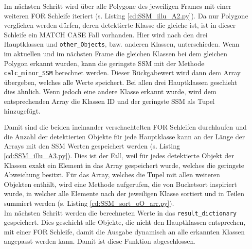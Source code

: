 {	Im nächsten Schritt wird über alle Polygone des jeweiligen Frames mit einer weiteren FOR Schleife iteriert \ifimportant (s. Listing \ref{cd:SSM_illu_A2.py})\fi. Da nur Polygone verglichen werden dürfen, deren detektierte Klasse die gleiche ist, ist in dieser Schleife ein MATCH CASE Fall vorhanden. Hier wird nach den drei Hauptklassen und \lstinline|other_Objects|, bzw. anderen Klassen, unterschieden. Wenn im aktuellen und im nächsten Frame die gleichen Klassen bei dem gleichen Polygon erkannt wurden, kann die geringste SSM mit der Methode \lstinline|calc_minor_SSM| berechnet werden. Dieser Rückgabewert wird dann dem Array übergeben, welches alle Werte speichert. Bei allen drei Hauptklassen geschieht dies ähnlich. Wenn jedoch eine andere Klasse erkannt wurde, wird dem entsprechenden Array die Klassen ID und der geringste SSM als Tupel hinzugefügt. \\

	\ifimportant
	
	\fi

	Damit sind die beiden ineinander verschachtelten FOR Schleifen durchlaufen und die Anzahl der detektierten Objekte für jede Hauptklasse kann an der Länge der Arrays mit den SSM Werten gespeichert werden \ifimportant (s. Listing \ref{cd:SSM_illu_A3.py})\fi. Dies ist der Fall, weil für jedes detektierte Objekt der Klassen exakt ein Element in das Array gespeichert wurde, welches die geringste Abweichung besitzt. Für das Array, welches die Tupel mit allen weiteren Objekten enthält, wird eine Methode aufgerufen, die von Bucketsort inspiriert wurde, in welcher alle Elemente nach der jeweiligen Klasse sortiert und in Teilen summiert werden \ifimportant (s. Listing \ref{cd:SSM_sort_oO_arr.py})\fi.  \\
	Im nächsten Schritt werden die berechneten Werte in das \lstinline|result_dictionary| gespeichert. Dies geschieht alle Objekte, die nicht den Hauptklassen entsprechen, mit einer FOR Schleife, damit die Ausgabe dynamisch an alle erkannten Klassen angepasst werden kann. Damit ist diese Funktion abgeschlossen. \\

	\ifimportant
	
	\fi

}
